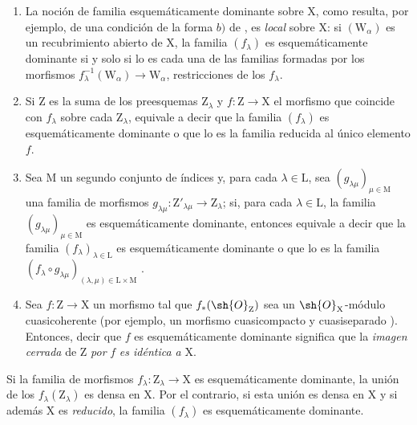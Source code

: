 \begin{remarks}[11.10.3]
\label{IV.11.10.3}
\medskip\noindent
\begin{enumerate}[label=(\roman*)]
  \item La noción de familia esquemáticamente dominante sobre $\mathrm{X}$, como resulta, por ejemplo, de una condición de la forma $b)$ de , es \emph{local} sobre $\mathrm{X}$: si $(\mathrm{W}_\alpha)$ es un recubrimiento abierto de $\mathrm{X}$, la familia $(f_\lambda)$ es esquemáticamente dominante si y solo si lo es cada una de las familias formadas por los morfismos $f_\lambda^{-1}(\mathrm{W}_\alpha)\to\mathrm{W}_\alpha$, restricciones de los $f_\lambda$.
  \item Si $\mathrm{Z}$ es la suma de los preesquemas $\mathrm{Z}_\lambda$ y $f:\mathrm{Z}\to\mathrm{X}$ el morfismo que coincide con $f_\lambda$ sobre cada $\mathrm{Z}_\lambda$, equivale a decir que la familia $(f_\lambda)$ es esquemáticamente dominante o que lo es la familia reducida al único elemento $f$.
  \item Sea $\mathrm{M}$ un segundo conjunto de índices y, para cada $\lambda\in\mathrm{L}$, sea $(g_{\lambda\mu})_{\mu\in\mathrm{M}}$ una familia de morfismos $g_{\lambda\mu}:\mathrm{Z}'_{\lambda\mu}\to\mathrm{Z}_\lambda$; si, para cada $\lambda\in\mathrm{L}$, la familia $(g_{\lambda\mu})_{\mu\in\mathrm{M}}$ es esquemáticamente dominante, entonces equivale a decir que la familia $(f_\lambda)_{\lambda\in\mathrm{L}}$ es esquemáticamente dominante o que lo es la familia $(f_\lambda\circ g_{\lambda\mu})_{(\lambda,\mu)\in\mathrm{L}\times\mathrm{M}}$ .
  \item Sea $f:\mathrm{Z}\to\mathrm{X}$ un morfismo tal que $f_*(\sh{O}_\mathrm{Z})$ sea un $\sh{O}_\mathrm{X}$-módulo cuasicoherente (por ejemplo, un morfismo cuasicompacto y cuasiseparado ).
  Entonces, decir que $f$ es esquemáticamente dominante significa que la \emph{imagen cerrada} de $\mathrm{Z}$ \emph{por} $f$  \emph{es idéntica a} $\mathrm{X}$.
\end{enumerate}
\end{remarks}

\begin{proposition}[11.10.4]
\label{IV.11.10.4}
Si la familia de morfismos $f_\lambda:\mathrm{Z}_\lambda\to\mathrm{X}$ es esquemáticamente dominante, la unión de los $f_\lambda(\mathrm{Z}_\lambda)$ es densa en $\mathrm{X}$.
Por el contrario, si esta unión es densa en $\mathrm{X}$ y si además $\mathrm{X}$ es \emph{reducido}, la familia $(f_\lambda)$ es esquemáticamente dominante.
\end{proposition}

